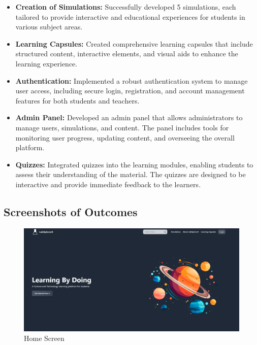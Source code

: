 \begin{itemize}[leftmargin=1cm]
    \item \textbf{Creation of Simulations:} Successfully developed 5 simulations, each tailored to provide interactive and educational experiences for students in various subject areas.
    
    \item \textbf{Learning Capsules:} Created comprehensive learning capsules that include structured content, interactive elements, and visual aids to enhance the learning experience.
    
    \item \textbf{Authentication:} Implemented a robust authentication system to manage user access, including secure login, registration, and account management features for both students and teachers.
    
    \item \textbf{Admin Panel:} Developed an admin panel that allows administrators to manage users, simulations, and content. The panel includes tools for monitoring user progress, updating content, and overseeing the overall platform.
    
    \item \textbf{Quizzes:} Integrated quizzes into the learning modules, enabling students to assess their understanding of the material. The quizzes are designed to be interactive and provide immediate feedback to the learners.
\end{itemize}
\subsection{Screenshots of Outcomes}
\begin{figure}[H]
    \centering
     \includegraphics[width = 16cm]{Diagrams/output/home.png}
     \caption{Home Screen}
 \end{figure}

